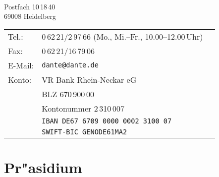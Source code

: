 \begingroup\small
\Dante{}\\%
Postfach 10\,18\,40\\
69008 Heidelberg

\smallskip
\begin{tabular*}{\textwidth}{@{}llr@{}}
Tel.:   & 0\,62\,21/2\,97\,66 (Mo., Mi.--Fr., 10.00--12.00\,Uhr)\\
Fax:    & 0\,62\,21/16\,79\,06\\
E-Mail: & \texttt{dante@dante.de}\\[6pt]
Konto: & VR Bank Rhein-Neckar eG\\
        & BLZ 670\,900\,00\\
        & Kontonummer 2\,310\,007\\
        & \texttt{IBAN DE67\,6709\,0000\,0002\,3100\,07}\\
        & \texttt{SWIFT-BIC GENODE61MA2}\\[4pt]
\end{tabular*}

\section{Pr"asidium}

